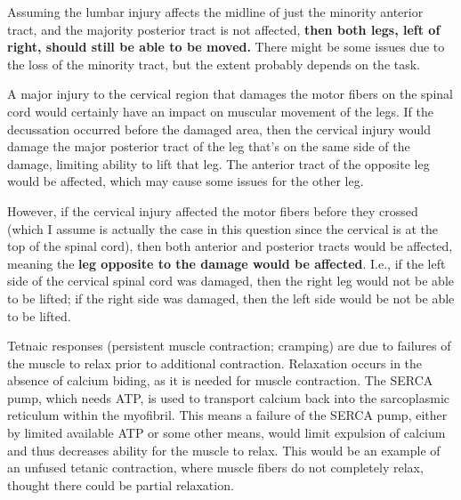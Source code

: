 \documentclass[basic]{inVerba-notes}
\begin{document}
\begin{enumerate}
  Assuming the lumbar injury affects the midline of just the minority anterior tract, and the majority posterior tract is not affected, \textbf{then both legs, left of right, should still be able to be moved.} There might be some issues due to the loss of the minority tract, but the extent probably depends on the task.



  A major injury to the cervical region that damages the motor fibers on the spinal cord would certainly have an impact on muscular movement of the legs. If the decussation occurred before the damaged area, then the cervical injury would damage the major posterior tract of the leg that's on the same side of the damage, limiting ability to lift that leg. The anterior tract of the opposite leg would be affected, which may cause some issues for the other leg.  

  However, if the cervical injury affected the motor fibers before they crossed (which I assume is actually the case in this question since the cervical is at the top of the spinal cord), then both anterior and posterior tracts would be affected, meaning the \textbf{leg opposite to the damage would be affected}. I.e., if the left side of the cervical spinal cord was damaged, then the right leg would not be able to be lifted; if the right side was damaged, then the left side would be not be able to be lifted.



  Tetnaic responses (persistent muscle contraction; cramping) are due to failures of the muscle to relax prior to additional contraction. Relaxation occurs in the absence of calcium biding, as it is needed for muscle contraction. The SERCA pump, which needs ATP, is used to transport calcium back into the sarcoplasmic reticulum within the myofibril. This means a failure of the SERCA pump, either by limited available ATP or some other means, would limit expulsion of calcium and thus decreases ability for the muscle to relax. This would be an example of an unfused tetanic contraction, where muscle fibers do not completely relax, thought there could be partial relaxation. 


\end{enumerate}
\end{document}
